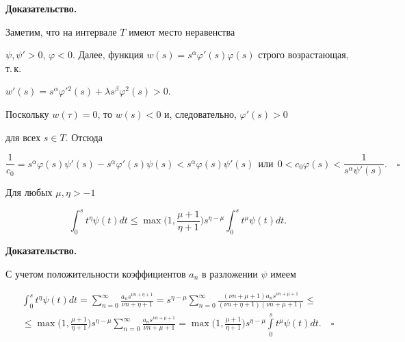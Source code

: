 {\bf Доказательство.}


Заметим, что на интервале $T$ имеют место неравенства


$\psi,\psi'>0$, $\varphi<0$. Далее, функция $w(s)=s^\alpha


\varphi'(s)\varphi(s)$ строго возрастающая, т.\,к.


$w'(s)=s^\alpha \varphi'{}^2(s)+\lambda s^\beta \varphi^2(s) >0$.


Поскольку $w(\tau)=0$, то $w(s) <0$ и, следовательно, $\varphi'(s)>0$


для всех $s \in T$. Отсюда


$$


\frac{1}{c_0}=s^\alpha\varphi(s)\psi'(s)-s^\alpha\varphi'(s)\psi(s)


< s^\alpha \varphi(s) \psi'(s) \ \ \text{или} \ \ 


0 <c_0\varphi(s) < \frac{1}{s^\alpha \psi'(s)}.\quad\square


$$








\begin{lems}\label{psi}


Для любых $\mu,\eta > -1$


$$


\int_0^s t^\eta \psi(t) dt \le\max\bigg(1,\frac{\mu+1}{\eta+1}


\bigg)s^{\eta-\mu}\int_0^s t^\mu \psi(t)dt.


$$


\end{lems}








{\bf Доказательство.}


С учетом положительности коэффициентов $a_n$ в разложении $\psi$ имеем


\begin{multline*}


\int_0^s t^\eta \psi(t) dt = \sum_{n=0}^\infty \frac{a_n


s^{\nu n +\eta+1}}{\nu n +\eta+1}=s^{\eta-\mu} \sum_{n=0}^\infty


\frac{(\nu n +\mu+1)a_n s^{\nu n +\mu+1}}{(\nu n +\eta+1)(\nu n


+\mu+1)} \le \\


%


\le \max\bigg(1,\frac{\mu+1}{\eta+1}\bigg)s^{\eta-\mu}


\sum_{n=0}^\infty \frac{a_n s^{\nu n +\mu+1}}{\nu n


+\mu+1}=\max\bigg(1,\frac{\mu+1}{\eta+1}\bigg)s^{\eta-\mu}\int\limits_0^s


t^\mu \psi(t)dt.\quad\square


\end{multline*}









